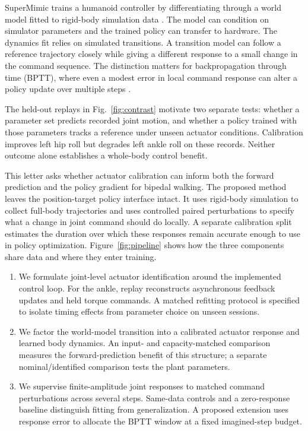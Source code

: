 \documentclass[letterpaper,10pt,conference]{ieeeconf}
\begin{document}
SuperMimic trains a humanoid controller by differentiating through a world model fitted to rigid-body simulation data \cite{supermimic}. The model can condition on simulator parameters and the trained policy can transfer to hardware. The dynamics fit relies on simulated transitions. A transition model can follow a reference trajectory closely while giving a different response to a small change in the command sequence. The distinction matters for backpropagation through time (BPTT), where even a modest error in local command response can alter a policy update over multiple steps \cite{blinkmimic,mbmix}.

The held-out replays in Fig.~\ref{fig:contrast} motivate two separate tests: whether a parameter set predicts recorded joint motion, and whether a policy trained with those parameters tracks a reference under unseen actuator conditions. Calibration improves left hip roll but degrades left ankle roll on these records. Neither outcome alone establishes a whole-body control benefit.

This letter asks whether actuator calibration can inform both the forward prediction and the policy gradient for bipedal walking. The proposed method leaves the position-target policy interface intact. It uses rigid-body simulation to collect full-body trajectories and uses controlled paired perturbations to specify what a change in joint command should do locally. A separate calibration split estimates the duration over which these responses remain accurate enough to use in policy optimization. Figure~\ref{fig:pipeline} shows how the three components share data and where they enter training.

\begin{enumerate}
  \item We formulate joint-level actuator identification around the implemented control loop. For the ankle, replay reconstructs asynchronous feedback updates and held torque commands. A matched refitting protocol is specified to isolate timing effects from parameter choice on unseen sessions.
  \item We factor the world-model transition into a calibrated actuator response and learned body dynamics. An input- and capacity-matched comparison measures the forward-prediction benefit of this structure; a separate nominal/identified comparison tests the plant parameters.
  \item We supervise finite-amplitude joint responses to matched command perturbations across several steps. Same-data controls and a zero-response baseline distinguish fitting from generalization. A proposed extension uses response error to allocate the BPTT window at a fixed imagined-step budget.
\end{enumerate}
\end{document}

